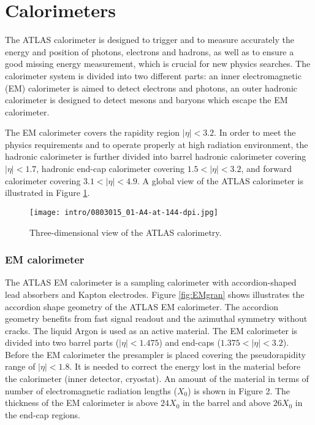 \section{Calorimeters}

The ATLAS calorimeter is designed to trigger and to measure accurately the energy and position of photons, electrons and hadrons, as well as to ensure a good missing energy measurement, which is crucial for new physics searches. The calorimeter system is divided into two different parts: an inner electromagnetic (EM) calorimeter is aimed to detect electrons and photons, an outer hadronic calorimeter is designed to detect mesons and baryons which escape the EM calorimeter.

The EM calorimeter covers the rapidity region $|\eta| < 3.2$.
In order to meet the physics requirements and to operate properly at high radiation environment, the hadronic calorimeter is further divided into barrel hadronic calorimeter covering $|\eta| < 1.7$, hadronic end-cap calorimeter covering $1.5 < |\eta| < 3.2$, and forward calorimeter covering $3.1 < |\eta| < 4.9$. A global view of the ATLAS calorimeter is illustrated in Figure \ref{fig:Calo}.

\begin{figure}[h!]
\centering
\texttt{[image: intro/0803015\_01-A4-at-144-dpi.jpg]}
\caption{ Three-dimensional view of the ATLAS calorimetry.}
\label{fig:Calo}
\end{figure}

\subsubsection{EM calorimeter}
The ATLAS EM calorimeter is a sampling calorimeter with accordion-shaped lead absorbers and Kapton electrodes.
Figure \ref{fig:EMgran} shows illustrates the accordion shape geometry of the ATLAS EM calorimeter. The accordion geometry benefits from fast signal readout and the azimuthal symmetry without cracks. The liquid Argon is used as an active material. The EM calorimeter is divided into two barrel parts ($|\eta|<1.475$) and end-caps ($1.375<|\eta|<3.2$).
Before the EM calorimeter the presampler is placed covering the pseudorapidity range of $|\eta|<1.8$. It is needed to correct the energy lost in the material before the calorimeter (inner detector, cryostat). An amount of the material in terms of number of electromagnetic radiation lengths ($X_0$) is shown in Figure 2.
The thickness of the EM calorimeter is above $24 X_0$ in the barrel and above $26 X_0$ in the end-cap regions.

